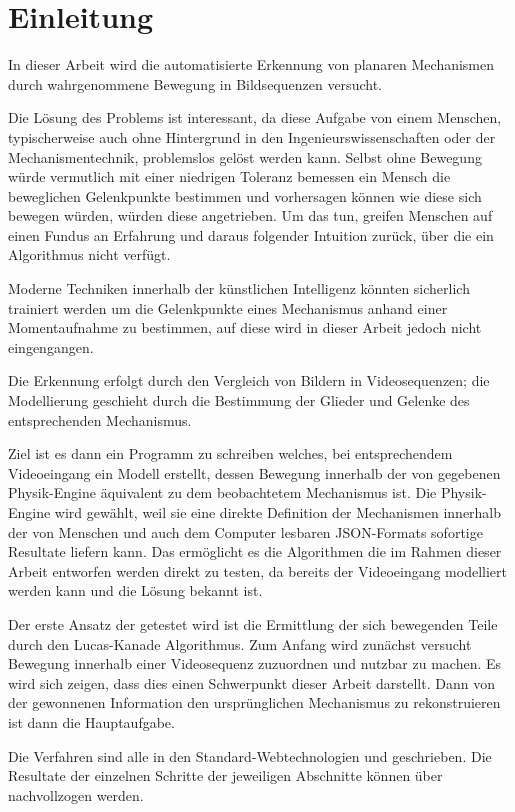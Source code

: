 %

\chapter{Einleitung}
\label{ch:einleitung}

In dieser Arbeit wird die automatisierte Erkennung von planaren Mechanismen durch wahrgenommene Bewegung in Bildsequenzen versucht.

Die Lösung des Problems ist interessant, da diese Aufgabe von einem Menschen, typischerweise auch ohne Hintergrund in den Ingenieurswissenschaften oder der Mechanismentechnik, problemslos gelöst werden kann.
Selbst ohne Bewegung würde vermutlich mit einer niedrigen Toleranz bemessen ein Mensch die beweglichen Gelenkpunkte bestimmen und vorhersagen können wie diese sich bewegen würden, würden diese angetrieben.
Um das tun, greifen Menschen auf einen Fundus an Erfahrung und daraus folgender Intuition zurück, über die ein Algorithmus nicht verfügt.

Moderne Techniken innerhalb der künstlichen Intelligenz könnten sicherlich trainiert werden um die Gelenkpunkte eines Mechanismus anhand einer Momentaufnahme zu bestimmen, auf diese wird in dieser Arbeit jedoch nicht eingengangen.

Die Erkennung erfolgt durch den Vergleich von Bildern in Videosequenzen; die Modellierung geschieht durch die Bestimmung der Glieder und Gelenke des entsprechenden Mechanismus.

Ziel ist es dann ein Programm zu schreiben welches, bei entsprechendem Videoeingang ein Modell erstellt, dessen Bewegung innerhalb der von  gegebenen Physik-Engine äquivalent zu dem beobachtetem Mechanismus ist.
Die  Physik-Engine wird gewählt, weil sie eine direkte Definition der Mechanismen innerhalb der von Menschen und auch dem Computer lesbaren JSON-Formats sofortige Resultate liefern kann.
Das ermöglicht es die Algorithmen die im Rahmen dieser Arbeit entworfen werden direkt zu testen, da bereits der Videoeingang modelliert werden kann und die Lösung bekannt ist.

Der erste Ansatz der getestet wird ist die Ermittlung der sich bewegenden Teile durch den Lucas-Kanade Algorithmus. %
Zum Anfang wird zunächst versucht Bewegung innerhalb einer Videosequenz zuzuordnen und nutzbar zu machen.
Es wird sich zeigen, dass dies einen Schwerpunkt dieser Arbeit darstellt.
Dann von der gewonnenen Information den ursprünglichen Mechanismus zu rekonstruieren ist dann die Hauptaufgabe.

Die Verfahren sind alle in den Standard-Webtechnologien  und  geschrieben.
Die Resultate der einzelnen Schritte der jeweiligen Abschnitte können über  nachvollzogen werden.

